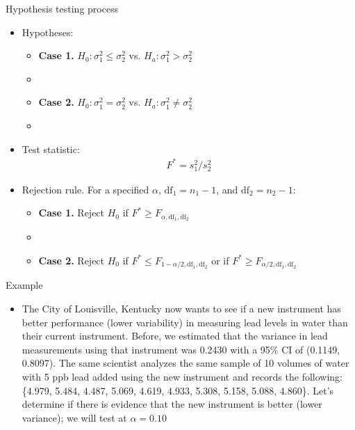 \documentclass[xcolor=dvipsnames]{beamer}
\begin{document}
\begin{frame}{Hypothesis testing process}
		\begin{itemize}
		\item Hypotheses: \pause
		\begin{itemize}
			\item \textbf{Case 1.} $H_0: \sigma_1^2 \leq \sigma_2^2$ vs. $H_a: \sigma_1^2 > \sigma_2^2$ \pause
			\item[]
			\item \textbf{Case 2.} $H_0: \sigma_1^2 = \sigma_2^2$ vs. $H_a: \sigma_1^2 \neq \sigma_2^2$
			\item[] \pause
		\end{itemize}
		
		\item Test statistic: \pause
		\begin{gather*}
		F^* = s_1^2 /s_2^2
		\end{gather*}
		
		\item Rejection rule. For a specified $\alpha$, $\text{df}_1 = n_1 - 1$, and $\text{df}_2 = n_2-1$: \pause
		\begin{itemize}
			\item \textbf{Case 1.} Reject $H_0$ if $F^* \geq F_{\alpha, \text{df}_1,\text{df}_2}$ \pause
			\item[]
			\item \textbf{Case 2.} Reject $H_0$ if $F^* \leq F_{1-\alpha / 2, \text{df}_1,\text{df}_2}$ or if $F^* \geq F_{\alpha / 2, \text{df}_1,\text{df}_2} $
		\end{itemize}
	\end{itemize}
\end{frame}

\begin{frame}{Example}
	\begin{itemize}
		\item The City of Louisville, Kentucky now wants to see if a new instrument has better performance (lower variability) in measuring lead levels in water than their current instrument. Before, we estimated that the variance in lead measurements using that instrument was 0.2430 with a 95\% CI of (0.1149, 0.8097). The same scientist analyzes the same sample of 10 volumes of water with 5 ppb lead added using the new instrument and records the following: \{4.979, 5.484, 4.487, 5.069, 4.619, 4.933, 5.308, 5.158, 5.088, 4.860\}. Let's determine if there is evidence that the new instrument is better (lower variance); we will test at $\alpha = 0.10$
	\end{itemize}
\end{frame}
\end{document}
